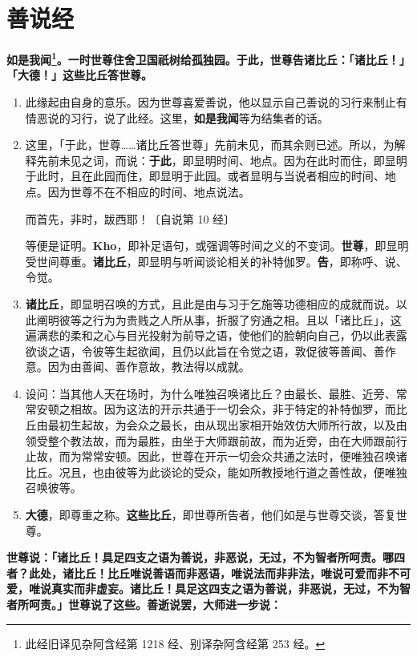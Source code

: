 \section{善说经}

\textbf{如是我闻\footnote{此经旧译见杂阿含经第 1218 经、别译杂阿含经第 253 经。}。一时世尊住舍卫国祇树给孤独园。于此，世尊告诸比丘：「诸比丘！」「大德！」这些比丘答世尊。}

\begin{enumerate}\item 此缘起由自身的意乐。因为世尊喜爱善说，他以显示自己善说的习行来制止有情恶说的习行，说了此经。这里，\textbf{如是我闻}等为结集者的话。
\item 这里，「于此，世尊……诸比丘答世尊」先前未见，而其余则已述。所以，为解释先前未见之词，而说：\textbf{于此}，即显明时间、地点。因为在此时而住，即显明于此时，且在此园而住，即显明于此园。或者显明与当说者相应的时间、地点。因为世尊不在不相应的时间、地点说法。\begin{quoting}而首先，非时，跋西耶！{\bluefootnotesize 〔自说第 10 经〕}\end{quoting}等便是证明。\textbf{Kho}，即补足语句，或强调等时间之义的不变词。\textbf{世尊}，即显明受世间尊重。\textbf{诸比丘}，即显明与听闻谈论相关的补特伽罗。\textbf{告}，即称呼、说、令觉。
\item \textbf{诸比丘}，即显明召唤的方式，且此是由与习于乞施等功德相应的成就而说。以此阐明彼等之行为为贵贱之人所从事，折服了穷通之相。且以「诸比丘」，这遍满悲的柔和之心与目光投射为前导之语，使他们的脸朝向自己，仍以此表露欲谈之语，令彼等生起欲闻，且仍以此旨在令觉之语，敦促彼等善闻、善作意。因为由善闻、善作意故，教法得以成就。
\item 设问：当其他人天在场时，为什么唯独召唤诸比丘？由最长、最胜、近旁、常常安顿之相故。因为这法的开示共通于一切会众，非于特定的补特伽罗，而比丘由最初生起故，为会众之最长，由从现出家相开始效仿大师所行故，以及由领受整个教法故，而为最胜，由坐于大师跟前故，而为近旁，由在大师跟前行止故，而为常常安顿。因此，世尊在开示一切会众共通之法时，便唯独召唤诸比丘。况且，也由彼等为此谈论的受众，能如所教授地行道之善性故，便唯独召唤彼等。
\item \textbf{大德}，即尊重之称。\textbf{这些比丘}，即世尊所告者，他们如是与世尊交谈，答复世尊。\end{enumerate}

\textbf{世尊说：「诸比丘！具足四支之语为善说，非恶说，无过，不为智者所呵责。哪四者？此处，诸比丘！比丘唯说善语而非恶语，唯说法而非非法，唯说可爱而非不可爱，唯说真实而非虚妄。诸比丘！具足这四支之语为善说，非恶说，无过，不为智者所呵责。」世尊说了这些。善逝说罢，大师进一步说：}

